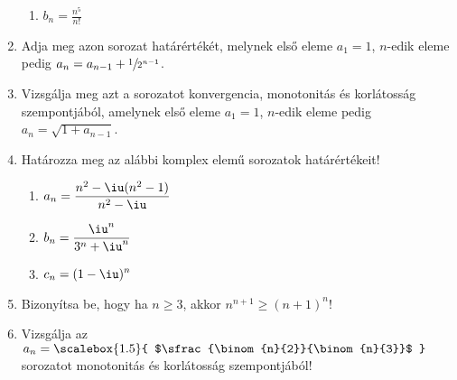 \documentclass[a4paper, 12pt]{scrartcl}
\begin{document}
\begin{enumerate}
\begin{enumerate}
          \item $\displaystyle
                  b_n = \frac{n^5}{n!}
                $
        \end{enumerate}

  \item Adja meg azon sorozat határértékét, melynek első eleme $a_1 = 1$,
        $n$-edik eleme pedig $a_n = a_{n - 1} + \sfrac{1}{2^{n - 1}}$.

  \item Vizsgálja meg azt a sorozatot konvergencia, monotonitás és korlátosság
        szempontjából, amelynek első eleme $a_1 = 1$, $n$-edik eleme pedig
        $a_n = \sqrt{1 + a_{n - 1}}$.

  \item Határozza meg az alábbi komplex elemű sorozatok határértékeit!
        \begin{enumerate}
          \item $\displaystyle
                  a_n = \frac{n^2 - \iu(n^2 - 1)}{n^2 - \iu}
                $

          \item $\displaystyle
                  b_n = \frac{\iu^n}{3^n + \iu^n}
                $

          \item $\displaystyle
                  c_n = (1 - \iu)^n
                $
        \end{enumerate}

  \item Bizonyítsa be, hogy ha $n \geq 3$, akkor $n^{n + 1} \geq (n + 1)^n$!

  \item Vizsgálja az $a_n = \scalebox{1.5}{
        $\sfrac{\binom{n}{2}}{\binom{n}{3}}$
          }$ sorozatot monotonitás és korlátosság szempontjából!
\end{enumerate}

\end{document}
